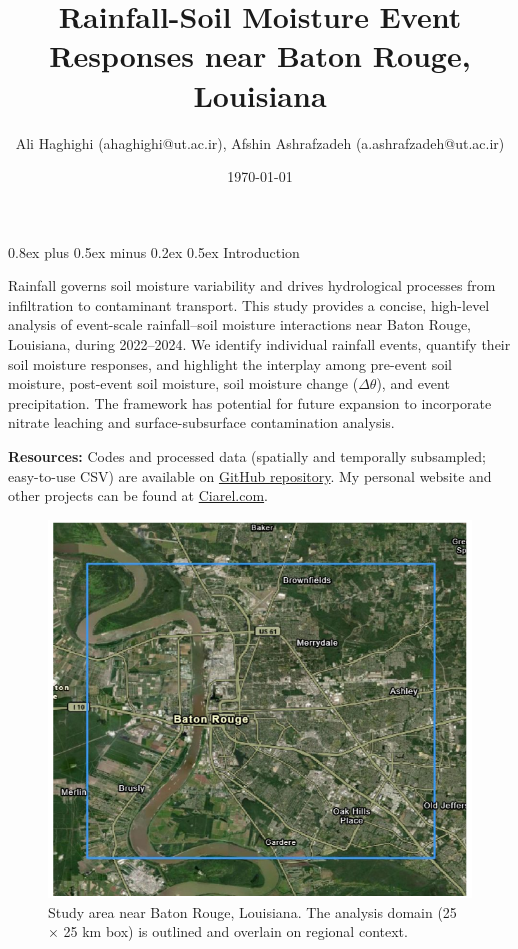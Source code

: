 \documentclass[9pt, twocolumn]{extarticle}
\title{Rainfall-Soil Moisture Event Responses near Baton Rouge, Louisiana}
\author{%
  \large Ali Haghighi \normalsize{(ahaghighi@ut.ac.ir)}\large, Afshin Ashrafzadeh \normalsize{(a.ashrafzadeh@ut.ac.ir)}
}
\date{\large \today}
\makeatletter
\renewcommand\section{\@startsection{section}{1}{0pt}%
  {0.8ex plus 0.5ex minus 0.2ex}%
  {0.5ex}%
  {\normalfont\Large\bfseries}}
\renewcommand{\maketitle}{\bgroup\setlength{\parindent}{0pt}
\vspace*{-\topskip}%
\begin{flushleft}
  \huge\textbf{\@title}

  \vspace{0.20cm}

  \normalsize\@author \hfill \normalsize\@date

  \vspace{0.25cm}\hrule\vspace{0.25cm}
\end{flushleft}
\egroup}
\makeatother
\begin{document}
\twocolumn[
  \begin{@twocolumnfalse}
    \maketitle
  \end{@twocolumnfalse}
]


\section{Introduction}

Rainfall governs soil moisture variability and drives hydrological processes from infiltration to contaminant transport. This study provides a concise, high-level analysis of event-scale rainfall–soil moisture interactions near Baton Rouge, Louisiana, during 2022–2024. We identify individual rainfall events, quantify their soil moisture responses, and highlight the interplay among pre-event soil moisture, post-event soil moisture, soil moisture change ($\Delta \theta$), and event precipitation. The framework has potential for future expansion to incorporate nitrate leaching and surface-subsurface contamination analysis.

\noindent\textbf{Resources: }
Codes and processed data (spatially and temporally subsampled; easy-to-use CSV) are available on \href{https://github.com/Alioax/rainfall-soil-moisture/}{GitHub repository}. 
My personal website and other projects can be found at \href{https://ciarel.com}{Ciarel.com}.

\begin{figure}[!b] %
  \centering
  \includegraphics[width=0.95\columnwidth]{map}
  \caption{Study area near Baton Rouge, Louisiana. The analysis domain (25 $\times$ 25 km box) is outlined and overlain on regional context.}
  \label{fig:map}
\end{figure}
\end{document}
